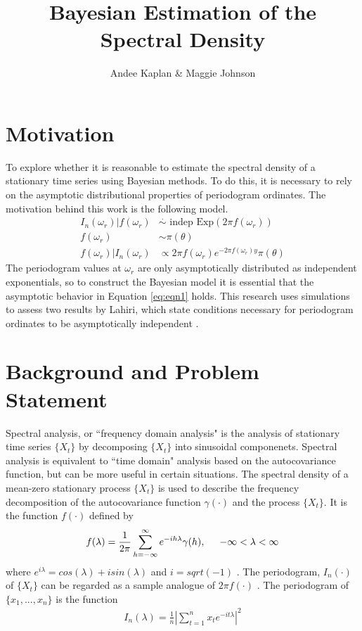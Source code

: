 \documentclass{article}\usepackage{graphicx, color}
\title{Bayesian Estimation of the Spectral Density}
\author{Andee Kaplan \& Maggie Johnson}
\newcommand{\mj}[1]{{\color{blue} #1}}
\theoremstyle{plain}
\begin{document}
\maketitle



\section{Motivation}

To explore whether it is reasonable to estimate the spectral density of a stationary time series using Bayesian methods. To do this, it is necessary to rely on the asymptotic distributional properties of periodogram ordinates. The motivation behind this work is the following model.
\begin{align}
\label{eq:eqn1}
I_n(\omega_r) |f(\omega_r) &\stackrel{\cdot}{\sim}\text{ indep } \text{Exp}(2\pi f(\omega_r)) \\
\label{eq:eqn2}
f(\omega_r) & \sim \pi(\theta)\\
\label{eq:eqn3}
f(\omega_r) | I_n(\omega_r) &\propto 2\pi f(\omega_r) e^{-2\pi f(\omega_r) y} \pi(\theta)
\end{align}
The periodogram values at $\omega_r$ are only asymptotically distributed as independent exponentials, so to construct the Bayesian model it is essential that the asymptotic behavior in Equation \ref{eq:eqn1} holds. This research uses simulations to assess two results by Lahiri, which state conditions necessary for periodogram ordinates to be asymptotically independent \cite{lahiri2003necessary}.


\section{Background and Problem Statement}

Spectral analysis, or ``frequency domain analysis" is the analysis of stationary time series $\{X_t\}$ by decomposing $\{X_t\}$ into sinusoidal componenets. Spectral analysis is equivalent to ``time domain" analysis based on the autocovariance function, but \mj{can be more useful in certain situations}. The spectral density of a mean-zero stationary process $\{X_t\}$ is used to describe the frequency decomposition of the autocovariance function $\gamma(\cdot)$ and the process $\{X_t\}$. It is the function $f(\cdot)$ defined by 
\begin{align}
f(\lambda) = \frac{1}{2\pi} \sum_{h=-\infty}^{\infty} e^{-ih\lambda} \gamma(h), \hspace{.5cm} -\infty < \lambda < \infty
\end{align}
where $e^{i\lambda}=cos(\lambda)+isin(\lambda)$ and $i=sqrt(-1)$ \cite{brockwell2002introduction}. The periodogram, $I_n(\cdot)$ of $\{X_t\}$ can be regarded as a \mj{sample analogue} of $2\pi f(\cdot)$ \cite{brockwell2002introduction}. The periodogram of $\{x_1,...,x_n\}$ is the function
\begin{align}
I_n(\lambda) = \frac{1}{n} \left\lvert \sum_{t=1}^n x_t e^{-it\lambda} \right\rvert^2
\end{align}
\end{document}
